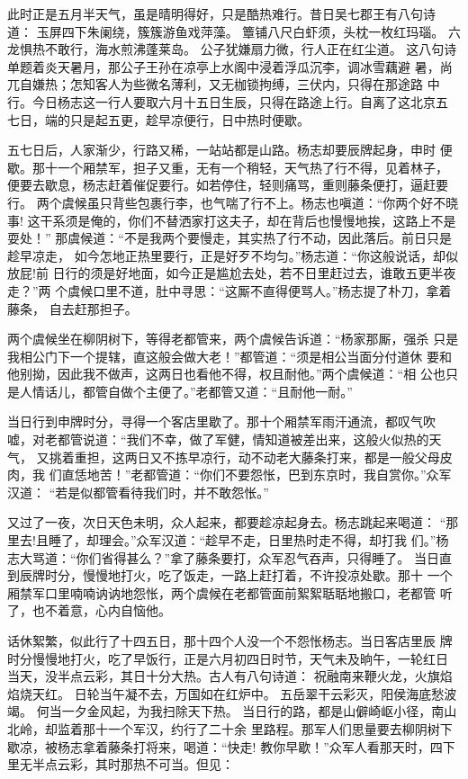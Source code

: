 此时正是五月半天气，虽是晴明得好，只是酷热难行。昔日吴七郡王有八句诗
道：
玉屏四下朱阑绕，簇簇游鱼戏萍藻。
簟铺八尺白虾须，头枕一枚红玛瑙。
六龙惧热不敢行，海水煎沸蓬莱岛。
公子犹嫌扇力微，行人正在红尘道。
这八句诗单题着炎天暑月，那公子王孙在凉亭上水阁中浸着浮瓜沉李，调冰雪藕避
暑，尚兀自嫌热；怎知客人为些微名薄利，又无枷锁拘缚，三伏内，只得在那途路
中行。今日杨志这一行人要取六月十五日生辰，只得在路途上行。自离了这北京五
七日，端的只是起五更，趁早凉便行，日中热时便歇。

五七日后，人家渐少，行路又稀，一站站都是山路。杨志却要辰牌起身，申时
便歇。那十一个厢禁军，担子又重，无有一个稍轻，天气热了行不得，见着林子，
便要去歇息，杨志赶着催促要行。如若停住，轻则痛骂，重则藤条便打，逼赶要行。
两个虞候虽只背些包裹行李，也气喘了行不上。杨志也嗔道：“你两个好不晓事!
这干系须是俺的，你们不替洒家打这夫子，却在背后也慢慢地挨，这路上不是耍处！”
那虞候道：“不是我两个要慢走，其实热了行不动，因此落后。前日只是趁早凉走，
如今怎地正热里要行，正是好歹不均匀。”杨志道：“你这般说话，却似放屁!前
日行的须是好地面，如今正是尴尬去处，若不日里赶过去，谁敢五更半夜走？”两
个虞候口里不道，肚中寻思：“这厮不直得便骂人。”杨志提了朴刀，拿着藤条，
自去赶那担子。

两个虞候坐在柳阴树下，等得老都管来，两个虞候告诉道：“杨家那厮，强杀
只是我相公门下一个提辖，直这般会做大老！”都管道：“须是相公当面分付道休
要和他别拗，因此我不做声，这两日也看他不得，权且耐他。”两个虞候道：“相
公也只是人情话儿，都管自做个主便了。”老都管又道：“且耐他一耐。”

当日行到申牌时分，寻得一个客店里歇了。那十个厢禁军雨汗通流，都叹气吹
嘘，对老都管说道：“我们不幸，做了军健，情知道被差出来，这般火似热的天气，
又挑着重担，这两日又不拣早凉行，动不动老大藤条打来，都是一般父母皮肉，我
们直恁地苦！”老都管道：“你们不要怨怅，巴到东京时，我自赏你。”众军汉道：
“若是似都管看待我们时，并不敢怨怅。”

又过了一夜，次日天色未明，众人起来，都要趁凉起身去。杨志跳起来喝道：
“那里去!且睡了，却理会。”众军汉道：“趁早不走，日里热时走不得，却打我
们。”杨志大骂道：“你们省得甚么？”拿了藤条要打，众军忍气吞声，只得睡了。
当日直到辰牌时分，慢慢地打火，吃了饭走，一路上赶打着，不许投凉处歇。那十
一个厢禁军口里喃喃讷讷地怨怅，两个虞候在老都管面前絮絮聒聒地搬口，老都管
听了，也不着意，心内自恼他。

话休絮繁，似此行了十四五日，那十四个人没一个不怨怅杨志。当日客店里辰
牌时分慢慢地打火，吃了早饭行，正是六月初四日时节，天气未及晌午，一轮红日
当天，没半点云彩，其日十分大热。古人有八句诗道：
祝融南来鞭火龙，火旗焰焰烧天红。
日轮当午凝不去，万国如在红炉中。
五岳翠干云彩灭，阳侯海底愁波竭。
何当一夕金风起，为我扫除天下热。
当日行的路，都是山僻崎岖小径，南山北岭，却监着那十一个军汉，约行了二十余
里路程。那军人们思量要去柳阴树下歇凉，被杨志拿着藤条打将来，喝道：“快走!
教你早歇！”众军人看那天时，四下里无半点云彩，其时那热不可当。但见：

